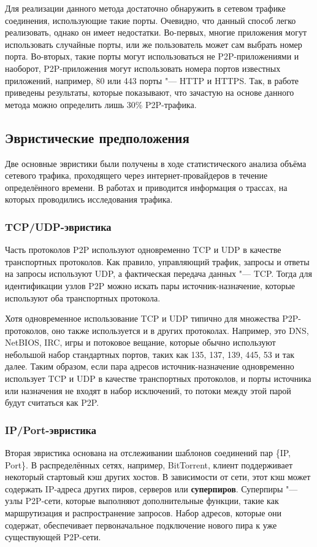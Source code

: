 \documentclass[bachelor, och, coursework]{SCWorks}
\begin{document}
Для реализации данного метода достаточно обнаружить в сетевом трафике соединения, использующие такие порты.
Очевидно, что данный способ легко реализовать, однако он имеет недостатки. Во-первых, многие приложения могут
использовать случайные порты, или же пользователь может сам выбрать номер порта. Во-вторых, такие порты могут использоваться не P2P-приложениями и наоборот, P2P-приложения могут использовать номера портов известных приложений, например, 80 или 443 порты "--- HTTP и HTTPS. Так, в работе \cite{30percent}
приведены результаты, которые показывают, что зачастую на основе данного метода можно определить лишь 30\% P2P-трафика.

\subsection{Эвристические предположения}
Две основные эвристики были получены в ходе статистического анализа объёма сетевого трафика, проходящего через интернет-провайдеров в течение определённого времени. В работах \cite{blinc} и \cite{layerid} приводится информация о трассах, на которых проводились исследования трафика.

\subsubsection{TCP/UDP-эвристика}
Часть протоколов P2P используют одновременно TCP и UDP в качестве транспортных протоколов. Как правило, управляющий трафик, запросы и ответы на запросы используют UDP, а фактическая передача данных "--- TCP. Тогда для идентификации узлов P2P можно искать пары источник-назначение, которые используют оба транспортных протокола.

Хотя одновременное использование TCP и UDP типично для множества P2P-протоколов, оно также используется и в других протоколах. Например, это DNS, NetBIOS, IRC, игры и потоковое вещание, которые обычно используют небольшой набор стандартных портов, таких как 135, 137, 139, 445, 53 и так далее. Таким образом, если пара адресов источник-назначение одновременно использует TCP и UDP в качестве транспортных протоколов, и порты источника или назначения не входят в набор исключений, то потоки между этой парой будут считаться как P2P.

\subsubsection{IP/Port-эвристика}
Вторая эвристика основана на отслеживании шаблонов соединений пар \{IP, Port\}. В распределённых сетях, например, BitTorrent, клиент поддерживает некоторый стартовый кэш других хостов. В зависимости от сети, этот кэш может содержать IP-адреса других пиров, серверов или \textbf{суперпиров}. Суперпиры "--- узлы P2P-сети, которые выполняют дополнительные функции, такие как маршрутизация и распространение запросов. Набор адресов, которые они содержат, обеспечивает первоначальное подключение нового пира к уже существующей P2P-сети.
\end{document}
